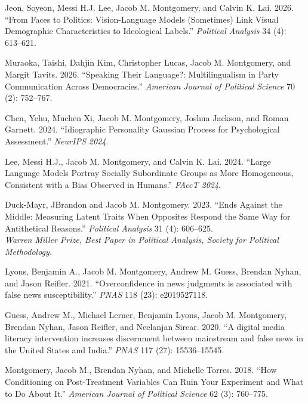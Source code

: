 \documentclass[10pt]{article}
\newenvironment{CVpub}
  {\begin{list}{}
    {\setlength{\labelwidth}{0pt}
    \setlength{\leftmargin}{14pt}
    \setlength{\itemindent}{-14pt}
    \setlength{\itemsep}{2pt}
    \setlength{\parsep}{0pt}
  }}
  {\end{list}}
\begin{document}
\begin{CVpub}

\item[] Jeon, Soyeon, Messi H.J. Lee, Jacob M. Montgomery, and Calvin K. Lai. 2026. ``From Faces to Politics: Vision-Language Models (Sometimes) Link Visual Demographic Characteristics to Ideological Labels.'' \textit{Political Analysis} 34 (4): 613--621.

\item[] Muraoka, Taishi, Dahjin Kim, Christopher Lucas, Jacob M. Montgomery, and Margit Tavits. 2026. ``Speaking Their Language?: Multilingualism in Party Communication Across Democracies.'' \textit{American Journal of Political Science} 70 (2): 752--767.

\item[] Chen, Yehu, Muchen Xi, Jacob M. Montgomery, Joshua Jackson, and Roman Garnett. 2024. ``Idiographic Personality Gaussian Process for Psychological Assessment.'' \emph{NeurIPS 2024}.

\item[] Lee, Messi H.J., Jacob M. Montgomery, and Calvin K. Lai. 2024. ``Large Language Models Portray Socially Subordinate Groups as More Homogeneous, Consistent with a Bias Observed in Humans.'' \emph{FAccT 2024}.

\item[] Duck-Mayr, JBrandon and Jacob M. Montgomery. 2023. ``Ends Against the Middle: Measuring Latent Traits When Opposites Respond the Same Way for Antithetical Reasons.'' \emph{Political Analysis} 31 (4): 606--625.\\[0.1em]
{\small\itshape Warren Miller Prize, Best Paper in \emph{Political Analysis}, Society for Political Methodology.}

\item[] Lyons, Benjamin A., Jacob M. Montgomery, Andrew M. Guess, Brendan Nyhan, and Jason Reifler. 2021. ``Overconfidence in news judgments is associated with false news susceptibility.'' \textit{PNAS} 118 (23): e2019527118.

\item[] Guess, Andrew M., Michael Lerner, Benjamin Lyons, Jacob M. Montgomery, Brendan Nyhan, Jason Reifler, and Neelanjan Sircar. 2020. ``A digital media literacy intervention increases discernment between mainstream and false news in the United States and India.'' \textit{PNAS} 117 (27): 15536--15545.

\item[] Montgomery, Jacob M., Brendan Nyhan, and Michelle Torres. 2018. ``How Conditioning on Post-Treatment Variables Can Ruin Your Experiment and What to Do About It.'' \textit{American Journal of Political Science} 62 (3): 760--775.


\end{CVpub}
\end{document}
